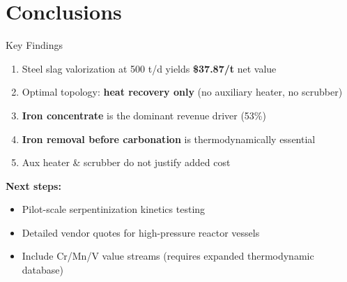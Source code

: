 \documentclass[aspectratio=169]{beamer}
\begin{document}
\section{Conclusions}

\begin{frame}{Key Findings}
\begin{enumerate}
    \item Steel slag valorization at 500 t/d yields \textcolor{revenue}{\textbf{\$37.87/t}} net value
    \item Optimal topology: \textbf{heat recovery only} (no auxiliary heater, no scrubber)
    \item \textbf{Iron concentrate} is the dominant revenue driver (53\%)
    \item \textbf{Iron removal before carbonation} is thermodynamically essential
    \item Aux heater \& scrubber do not justify added cost
\end{enumerate}
\vspace{12pt}
\textbf{Next steps:}
\begin{itemize}
    \item Pilot-scale serpentinization kinetics testing
    \item Detailed vendor quotes for high-pressure reactor vessels
    \item Include Cr/Mn/V value streams (requires expanded thermodynamic database)
\end{itemize}
\end{frame}
\end{document}
